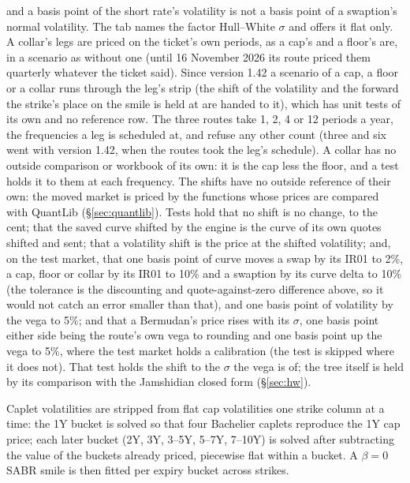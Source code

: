 \documentclass[11pt,a4paper]{article}
\begin{document}
and a basis point of the short rate's volatility is not a basis point of a swaption's normal volatility. The tab names the factor Hull--White $\sigma$ and offers it flat only. A collar's legs are priced on the ticket's own periods, as a cap's and a floor's are, in a scenario as without one (until 16 November 2026 its route priced them quarterly whatever the ticket said). Since version 1.42 a scenario of a cap, a floor or a collar runs through the leg's strip (the shift of the volatility and the forward the strike's place on the smile is held at are handed to it), which has unit tests of its own and no reference row. The three routes take 1, 2, 4 or 12 periods a year, the frequencies a leg is scheduled at, and refuse any other count (three and six went with version 1.42, when the routes took the leg's schedule). A collar has no outside comparison or workbook of its own: it is the cap less the floor, and a test holds it to them at each frequency. The shifts have no outside reference of their own: the moved market is priced by the functions whose prices are compared with QuantLib (\S\ref{sec:quantlib}). Tests hold that no shift is no change, to the cent; that the saved curve shifted by the engine is the curve of its own quotes shifted and sent; that a volatility shift is the price at the shifted volatility; and, on the test market, that one basis point of curve moves a swap by its IR01 to 2\%, a cap, floor or collar by its IR01 to 10\% and a swaption by its curve delta to 10\% (the tolerance is the discounting and quote-against-zero difference above, so it would not catch an error smaller than that), and one basis point of volatility by the vega to 5\%; and that a Bermudan's price rises with its $\sigma$, one basis point either side being the route's own vega to rounding and one basis point up the vega to 5\%, where the test market holds a calibration (the test is skipped where it does not). That test holds the shift to the $\sigma$ the vega is of; the tree itself is held by its comparison with the Jamshidian closed form (\S\ref{sec:hw}).

Caplet volatilities are stripped from flat cap volatilities one strike column at a time: the 1Y bucket is solved so that four Bachelier caplets reproduce the 1Y cap price; each later bucket (2Y, 3Y, 3--5Y, 5--7Y, 7--10Y) is solved after subtracting the value of the buckets already priced, piecewise flat within a bucket. A $\beta=0$ SABR smile is then fitted per expiry bucket across strikes.

\end{document}
